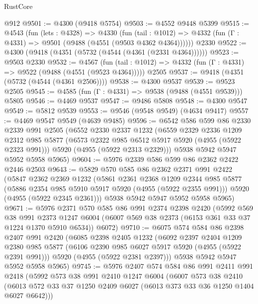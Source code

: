 \begin{lexlean}{RustCore}
\begin{coremodule}
    @912
@9501 := @4300 (@9418 @5754)
@9503 := @4552 @9448 @5399
@9515 := @4543
    (fun (lets : @4328) =>
    @4330
      (fun (tail : @1012) => @4332 (fun (Γ : @4331) => @9501 (@9488 (@4551 (@9503 @4362 @4364))))))
    @2330
@9522 := @4300 (@9418 (@4351 (@5732 (@4544 (@4361 (@2331 @4364))))))
@9523 := @9503 @2330
@9532 := @4567
    (fun (tail : @1012) => @4332 (fun (Γ : @4331) => @9522 (@9488 (@4551 (@9523 @4364)))))
    @2505
@9537 := @9418 (@4351 (@5732 (@4544 (@4361 @2506))))
@9538 := @4300 @9537
@9539 := @9523 @2505
@9545 := @4585 (fun (Γ : @4331) => @9538 (@9488 (@4551 @9539))) @5805
@9546 := @4469 @9537
@9547 := @9486 @5808
@9548 := @4300 @9547
@9549 := @5812 @9539
@9553 := @9546 (@9548 @9549) (@4634 @9417)
@9557 := @4469 @9547 @9549 (@4639 @9485)
@9596 := @6542
    @586
    @599
    @86
    @2330
    @2339
    @991
    @2505
    (@6552
      @2330
      @2337
      @1232
      (@6559
        @2329
        @2336
        @1209
        @2312
        @985
        @5877
        (@6573 @2322 @985 @6512 @5917 @5920 (@4955 (@5922 @2323 @991)))
        @5920
        (@4955 (@5922 @2313 @2329)))
      @5938
      @5942
      @5947
      @5952
      @5958
      @5965)
@9604 := @5976 @2339 @586 @599 @86 @2362 @2422 @2446 @2503
@9643 := @5829
    @570
    @585
    @86
    @2362
    @2371
    @991
    @2422
    (@5847
      @2362
      @2369
      @1232
      (@5861
        @2361
        @2368
        @1209
        @2344
        @985
        @5877
        (@5886 @2354 @985 @5910 @5917 @5920 (@4955 (@5922 @2355 @991)))
        @5920
        (@4955 (@5922 @2345 @2361)))
      @5938
      @5942
      @5947
      @5952
      @5958
      @5965)
@9671 := @5976
    @2371
    @570
    @585
    @86
    @991
    @2374
    @2398
    @2420
    (@5992
      @569
      @38
      @991
      @2373
      @1247
      @6004
      (@6007 @569 @38 @2373 (@6153 @361 @33 @37 @1224 @1370 @5910 @6534))
      @6072)
@9710 := @6075
    @574
    @584
    @86
    @2398
    @2407
    @991
    @2420
    (@6085
      @2398
      @2405
      @1232
      (@6092
        @2397
        @2404
        @1209
        @2380
        @985
        @5877
        (@6106 @2390 @985 @6027 @5917 @5920 (@4955 (@5922 @2391 @991)))
        @5920
        (@4955 (@5922 @2381 @2397)))
      @5938
      @5942
      @5947
      @5952
      @5958
      @5965)
@9745 := @5976
    @2407
    @574
    @584
    @86
    @991
    @2411
    @991
    @2418
    (@5992
      @573
      @38
      @991
      @2410
      @1247
      @6004
      (@6007
        @573
        @38
        @2410
        (@6013 @572 @33 @37 @1250 @2409 @6027 (@6013 @373 @33 @36 @1250 @1404 @6027 @6642)))

\end{coremodule}
\end{lexlean}
